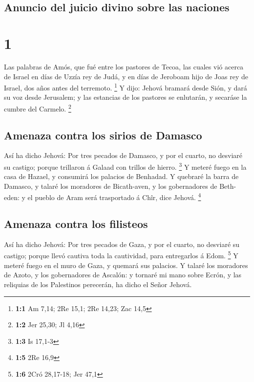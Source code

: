 \hypertarget{anuncio-del-juicio-divino-sobre-las-naciones}{%
\subsection{Anuncio del juicio divino sobre las
naciones}\label{anuncio-del-juicio-divino-sobre-las-naciones}}

\hypertarget{section}{%
\section{1}\label{section}}

 Las palabras de Amós, que fué entre los pastores de Tecoa,
las cuales vió acerca de Israel en días de Uzzía rey de Judá, y en días
de Jeroboam hijo de Joas rey de Israel, dos años antes del terremoto.
\footnote{\textbf{1:1} Am 7,14; 2Re 15,1; 2Re 14,23; Zac 14,5}
 Y dijo: Jehová bramará desde Sión, y dará su voz desde
Jerusalem; y las estancias de los pastores se enlutarán, y secaráse la
cumbre del Carmelo. \footnote{\textbf{1:2} Jer 25,30; Jl 4,16}

\hypertarget{amenaza-contra-los-sirios-de-damasco}{%
\subsection{Amenaza contra los sirios de
Damasco}\label{amenaza-contra-los-sirios-de-damasco}}

 Así ha dicho Jehová: Por tres pecados de Damasco, y por el
cuarto, no desviaré su castigo; porque trillaron á Galaad con trillos de
hierro. \footnote{\textbf{1:3} Is 17,1-3}  Y meteré fuego en
la casa de Hazael, y consumirá los palacios de Benhadad.  Y
quebraré la barra de Damasco, y talaré los moradores de Bicath-aven, y
los gobernadores de Beth-eden: y el pueblo de Aram será trasportado á
Chîr, dice Jehová. \footnote{\textbf{1:5} 2Re 16,9}

\hypertarget{amenaza-contra-los-filisteos}{%
\subsection{Amenaza contra los
filisteos}\label{amenaza-contra-los-filisteos}}

 Así ha dicho Jehová: Por tres pecados de Gaza, y por el
cuarto, no desviaré su castigo; porque llevó cautiva toda la cautividad,
para entregarlos á Edom. \footnote{\textbf{1:6} 2Cró 28,17-18; Jer 47,1}
 Y meteré fuego en el muro de Gaza, y quemará sus palacios.
 Y talaré los moradores de Azoto, y los gobernadores de
Ascalón: y tornaré mi mano sobre Ecrón, y las reliquias de los
Palestinos perecerán, ha dicho el Señor Jehová.

